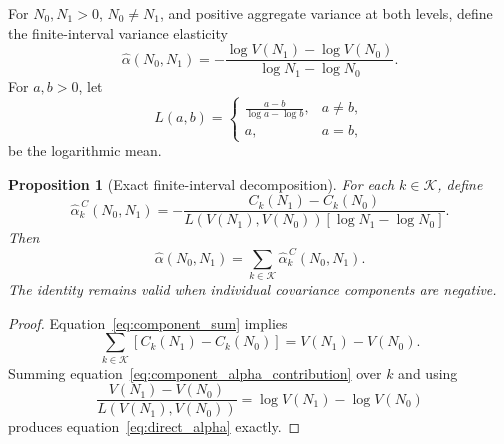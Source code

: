 \documentclass[a4paper,fleqn]{cas-dc}
\newtheorem{proposition}{Proposition}
\begin{document}
For $N_0,N_1>0$, $N_0\neq N_1$, and positive aggregate variance at both
levels, define the finite-interval variance elasticity
\begin{equation}
\label{eq:direct_alpha}
    \widehat{\alpha}(N_0,N_1)
    =
    -\frac{
        \log V(N_1)-\log V(N_0)
    }{
        \log N_1-\log N_0
    }.
\end{equation}
For $a,b>0$, let
\begin{equation}
\label{eq:log_mean}
    L(a,b)
    =
    \begin{cases}
        \displaystyle\frac{a-b}{\log a-\log b}, & a\neq b,\\[1em]
        a, & a=b,
    \end{cases}
\end{equation}
be the logarithmic mean.

\begin{proposition}[Exact finite-interval decomposition]
\label{prop:exact_decomposition}
For each $k\in\mathcal{K}$, define
\begin{equation}
\label{eq:component_alpha_contribution}
    \widehat{\alpha}^{\,C}_k(N_0,N_1)
    =
    -\frac{
        C_k(N_1)-C_k(N_0)
    }{
        L\!\left(V(N_1),V(N_0)\right)
        \left[\log N_1-\log N_0\right]
    }.
\end{equation}
Then
\begin{equation}
\label{eq:exact_alpha_decomposition}
    \widehat{\alpha}(N_0,N_1)
    =
    \sum_{k\in\mathcal{K}}
    \widehat{\alpha}^{\,C}_k(N_0,N_1).
\end{equation}
The identity remains valid when individual covariance components are
negative.
\end{proposition}

\begin{proof}
Equation~\eqref{eq:component_sum} implies
\begin{equation}
    \sum_{k\in\mathcal{K}}
    \left[C_k(N_1)-C_k(N_0)\right]
    =V(N_1)-V(N_0).
\end{equation}
Summing equation~\eqref{eq:component_alpha_contribution} over $k$ and
using
\begin{equation}
    \frac{V(N_1)-V(N_0)}{L(V(N_1),V(N_0))}
    =\log V(N_1)-\log V(N_0)
\end{equation}
produces equation~\eqref{eq:direct_alpha} exactly.
\end{proof}
\end{document}
